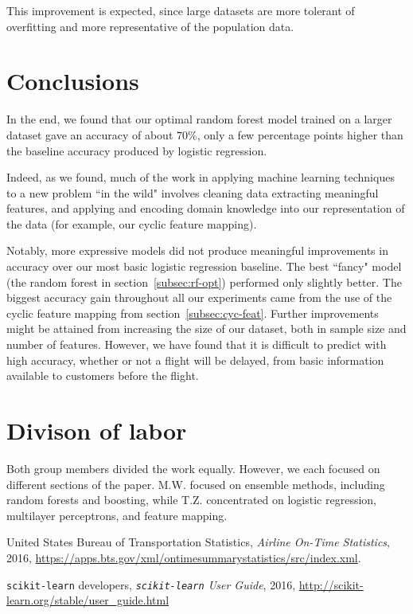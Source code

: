 \documentclass{article}
\begin{document}
\begin{multicols}{2}
This improvement is expected,
since large datasets are more tolerant of overfitting
and more representative of the population data.

\section{Conclusions}

In the end,
we found that our optimal random forest model
trained on a larger dataset gave an accuracy of about $70\%$,
only a few percentage points higher
than the baseline accuracy produced by logistic regression.

Indeed, as we found,
much of the work in applying machine learning techniques
to a new problem ``in the wild"
involves cleaning data
extracting meaningful features,
and applying and encoding domain knowledge
into our representation of the data
(for example, our cyclic feature mapping).

Notably, more expressive models
did not produce meaningful improvements in accuracy
over our most basic logistic regression baseline.
The best ``fancy" model
(the random forest in section~\ref{subsec:rf-opt})
performed only slightly better.
The biggest accuracy gain throughout all our experiments
came from the use of the cyclic feature mapping
from section~\ref{subsec:cyc-feat}.
Further improvements might be attained from
increasing the size of our dataset,
both in sample size and number of features.
However, we have found that it is difficult to predict
with high accuracy,
whether or not a flight will be delayed,
from basic information available to customers before the flight.

\section{Divison of labor}

Both group members divided the work equally.
However, we each focused on different sections of the paper.
M.W. focused on ensemble methods, including random forests and boosting,
while T.Z. concentrated on logistic regression,
multilayer perceptrons,
and feature mapping.

\begin{thebibliography}{4}
  United States Bureau of Transportation Statistics,
  \emph{Airline On-Time Statistics},
  2016,
  \url{https://apps.bts.gov/xml/ontimesummarystatistics/src/index.xml}.
  
  \texttt{scikit-learn} developers,
  \emph{\texttt{scikit-learn} User Guide},
  2016,
  \url{http://scikit-learn.org/stable/user_guide.html}
\end{thebibliography}


\end{multicols}
\end{document}

